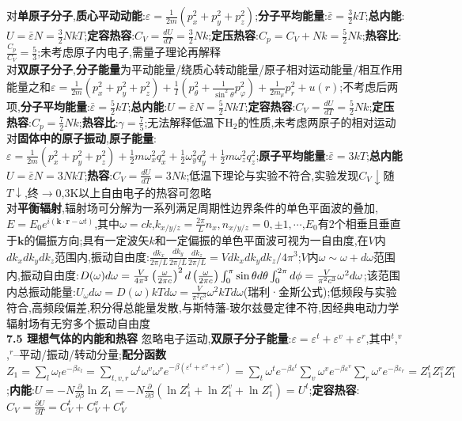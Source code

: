 \documentclass[10pt,a4paper]{article}
\begin{document}
\begin{multicols}{2}
对\textbf{单原子分子},\textbf{质心平动动能}:$\varepsilon=\frac{1}{2m}(p_x^2+p_y^2+p_z^2)$;\textbf{分子平均能量}:$\bar{\varepsilon}=\frac{3}{2}kT$;\textbf{总内能}:$U=\bar{\varepsilon}N=\frac{3}{2}NkT$;\textbf{定容热容}:$C_V=\frac{dU}{dT}=\frac{3}{2}Nk$;\textbf{定压热容}:$C_p=C_V+Nk=\frac{5}{2}Nk$;\textbf{热容比}:$\frac{C_p}{C_V}=\frac{5}{3}$;未考虑原子内电子,需量子理论再解释\\
对\textbf{双原子分子},\textbf{分子能量}为平动能量/绕质心转动能量/原子相对运动能量/相互作用能量之和$\varepsilon=\frac{1}{2m}(p_x^2+p_y^2+p_z^2)+\frac{1}{I}(p_{\theta}^2+\frac{1}{\sin^2\theta}p_{\varphi}^2)+\frac{1}{2m_{\mu}}p_r^2+u(r)$;不考虑后两项,\textbf{分子平均能量}:$\bar{\varepsilon}=\frac{5}{2}kT$;\textbf{总内能}:$U=\bar{\varepsilon}N=\frac{5}{2}NkT$;\textbf{定容热容}:$C_V=\frac{dU}{dT}=\frac{5}{2}Nk$;\textbf{定压热容}:$C_p=\frac{7}{2}Nk$;\textbf{热容比}:$\gamma=\frac{7}{5}$;无法解释低温下H$_2$的性质,未考虑两原子的相对运动\\
对\textbf{固体中的原子振动},\textbf{原子能量}:$\varepsilon=\frac{1}{2m}(p_x^2+p_y^2+p_z^2)+\frac{1}{2}m\omega_x^2q_x^2+\frac{1}{2}\omega_y^2q_y^2+\frac{1}{2}m\omega_z^2q_z^2$;\textbf{原子平均能量}:$\bar{\varepsilon}=3kT$;\textbf{总内能}$U=\bar{\varepsilon}N=3NkT$;\textbf{热容}:$C_V=\frac{dU}{dT}=3Nk$;低温下理论与实验不符合,实验发现$C_V\downarrow$随$T\downarrow$,终$\rightarrow0$,$3$K以上自由电子的热容可忽略\\
对\textbf{平衡辐射},辐射场可分解为一系列满足周期性边界条件的单色平面波的叠加,$E=E_0e^{i(\bm{k}\cdot\bm{r}-\omega t)}$,其中$\omega=ck$,$k_{x/y/z}=\frac{2\pi}{L}n_x,n_{x/y/z}=0,\pm1,\cdots$,$E_0$有$2$个相垂且垂直于$\bm{k}$的偏振方向;具有一定波矢$k$和一定偏振的单色平面波可视为一自由度,在$V$内$dk_xdk_ydk_z$范围内,振动自由度:$\frac{dk_x}{2\pi/L}\frac{dk_y}{2\pi/L}\frac{dk_z}{2\pi/L}=Vdk_xdk_ydk_z/4\pi^3$;$V$内$\omega\sim\omega+d\omega$范围内,振动自由度:$D(\omega)d\omega=\frac{V}{4\pi^3}\left(\frac{\omega}{2\pi c}\right)^2d\left(\frac{\omega}{2\pi c}\right)\int_0^{\pi}\sin\theta d\theta\\\int_0^{2\pi}d\phi=\frac{V}{\pi^2c^3}\omega^2d\omega$;该范围内总振动能量:$U_{\omega}d\omega=D(\omega)kTd\omega=\frac{V}{\pi^2c^3}\omega^2kTd\omega$(瑞利·金斯公式);低频段与实验符合,高频段偏差,积分得总能量发散,与斯特藩-玻尔兹曼定律不符,因经典电动力学辐射场有无穷多个振动自由度\\
\textbf{7.5 理想气体的内能和热容}
忽略电子运动,\textbf{双原子分子能量}:$\varepsilon=\varepsilon^t+\varepsilon^v+\varepsilon^r$,其中$^t$,$^v$,$^r$--平动/振动/转动分量;\textbf{配分函数}$Z_1=\sum_l\omega_le^{-\beta\varepsilon_l}=\sum_{t,v,r}\omega^t\omega^v\omega^re^{-\beta(\varepsilon^t+\varepsilon^v+\varepsilon^r)}=\sum_t\omega^te^{-\beta\varepsilon^t}\sum_v\omega^ve^{-\beta\varepsilon^v}\sum_r\omega^re^{-\beta\varepsilon_r}=Z_1^tZ_1^vZ_1^r$;\textbf{内能}:$U=-N\frac{\partial}{\partial\beta}\ln Z_1=-N\frac{\partial}{\partial\beta}(\ln Z_1^t+\ln Z_1^v+\ln Z_1^r)=U^t$;\textbf{定容热容}:$C_V=\frac{\partial U}{\partial T}=C_V^t+C_V^v+C_V^r$\\

\end{multicols}
\end{document}
